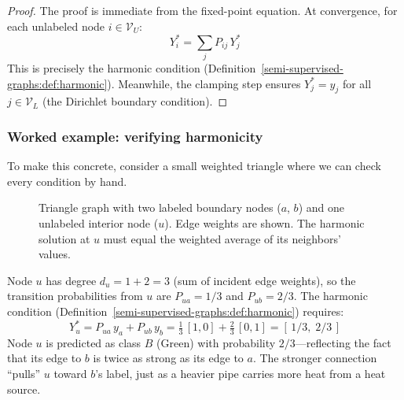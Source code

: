 \begin{notechapter}
\begin{proof}
The proof is immediate from the fixed-point equation. At convergence, for
each unlabeled node $i \in \mathcal{V}_U$:
\[
Y_i^* = \sum_j P_{ij}\,Y_j^*
\]
This is precisely the harmonic condition
(Definition~\ref{semi-supervised-graphs:def:harmonic}). Meanwhile, the clamping step ensures
$Y_j^* = y_j$ for all $j \in \mathcal{V}_L$ (the Dirichlet boundary
condition).
\end{proof}

\subsubsection*{Worked example: verifying harmonicity}

To make this concrete, consider a small weighted triangle where we can check
every condition by hand.

\begin{figure}[ht]
\centering
{}
\caption{Triangle graph with two labeled boundary nodes ($a$, $b$) and one
  unlabeled interior node ($u$). Edge weights are shown. The harmonic solution
  at $u$ must equal the weighted average of its neighbors' values.}
\label{semi-supervised-graphs:fig:harmonic_triangle}
\end{figure}

Node $u$ has degree $d_u = 1 + 2 = 3$ (sum of incident edge weights), so the
transition probabilities from $u$ are $P_{ua} = 1/3$ and $P_{ub} = 2/3$.
The harmonic condition (Definition~\ref{semi-supervised-graphs:def:harmonic}) requires:
\[
Y_u^* = P_{ua}\,y_a + P_{ub}\,y_b
= \tfrac{1}{3}\,[1,0] + \tfrac{2}{3}\,[0,1] = [\,1/3,\; 2/3\,]
\]
Node $u$ is predicted as class $B$ (Green) with probability $2/3$---reflecting
the fact that its edge to $b$ is twice as strong as its edge to $a$. The
stronger connection ``pulls'' $u$ toward $b$'s label, just as a heavier pipe
carries more heat from a heat source.


\end{notechapter}
